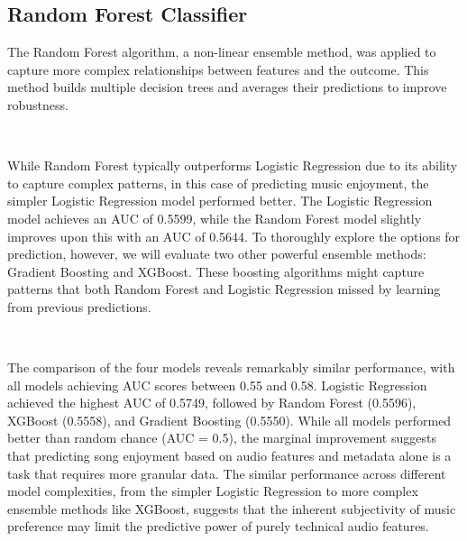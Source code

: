 \documentclass[11pt]{article}
\begin{document}
\subsection{Random Forest Classifier}\label{random-forest-classifier}

The Random Forest algorithm, a non-linear ensemble method, was applied
to capture more complex relationships between features and the outcome.
This method builds multiple decision trees and averages their
predictions to improve robustness.

    \begin{center}
    \end{center}
    { \hspace*{\fill} \\}
    
    While Random Forest typically outperforms Logistic Regression due to its
ability to capture complex patterns, in this case of predicting music
enjoyment, the simpler Logistic Regression model performed better. The
Logistic Regression model achieves an AUC of 0.5599, while the Random
Forest model slightly improves upon this with an AUC of 0.5644. To
thoroughly explore the options for prediction, however, we will evaluate
two other powerful ensemble methods: Gradient Boosting and XGBoost.
These boosting algorithms might capture patterns that both Random Forest
and Logistic Regression missed by learning from previous predictions.

    \begin{center}
    \end{center}
    { \hspace*{\fill} \\}
    
    The comparison of the four models reveals remarkably similar
performance, with all models achieving AUC scores between 0.55 and 0.58.
Logistic Regression achieved the highest AUC of 0.5749, followed by
Random Forest (0.5596), XGBoost (0.5558), and Gradient Boosting
(0.5550). While all models performed better than random chance (AUC =
0.5), the marginal improvement suggests that predicting song enjoyment
based on audio features and metadata alone is a task that requires more
granular data. The similar performance across different model
complexities, from the simpler Logistic Regression to more complex
ensemble methods like XGBoost, suggests that the inherent subjectivity
of music preference may limit the predictive power of purely technical
audio features.
\end{document}
